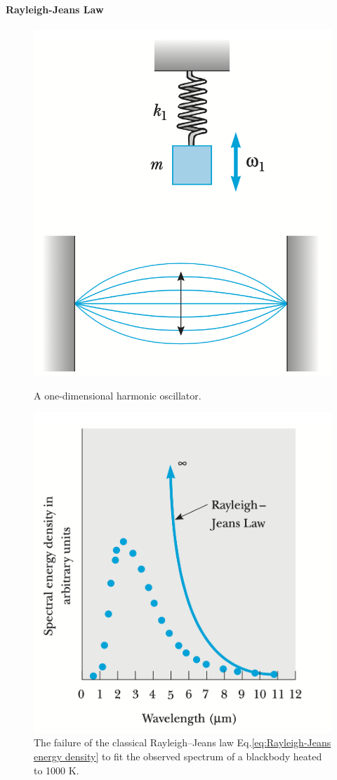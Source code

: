     \paragraph{\color{c3}Rayleigh-Jeans Law} %
    \label{par:Rayleigh-Jeans Law}     
    \begin{figure}
        \includegraphics[width=0.9\linewidth]{figures/standing wave.png}
        \caption{A one-dimensional harmonic oscillator.}
        \label{fig:A one-dimensional harmonic oscillator}
        \includegraphics[width=0.9\linewidth]{figures/spectral energy density.png}
        \caption{The failure of the classical Rayleigh–Jeans law Eq.\eqref{eq:Rayleigh-Jeans energy density} 
        to fit the observed spectrum of a blackbody heated to 1000 K.}
        \label{fig:spectral energy density}
    \end{figure}   

